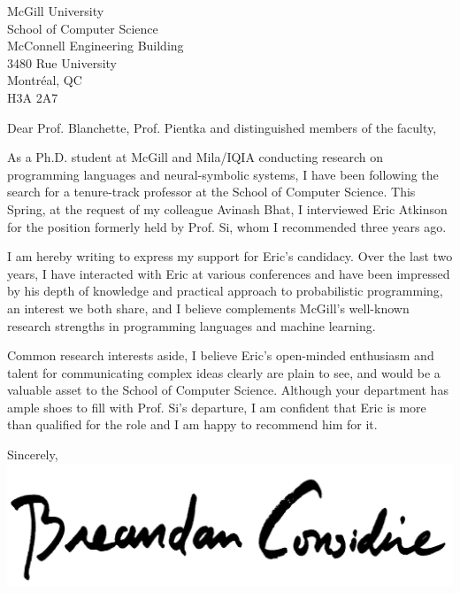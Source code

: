 \documentclass{letter}
\begin{document}
\begin{letter}{McGill University\\ School of Computer Science\\ McConnell Engineering Building\\ 3480 Rue University\\ Montr\'eal, QC\\ H3A 2A7}
  \opening{Dear Prof. Blanchette, Prof. Pientka and distinguished members of the faculty,}
  \vspace{12pt}

  As a Ph.D. student at McGill and Mila/IQIA conducting research on programming languages and neural-symbolic systems, I have been following the search for a tenure-track professor at the School of Computer Science. This Spring, at the request of my colleague Avinash Bhat, I interviewed Eric Atkinson for the position formerly held by Prof. Si, whom I recommended three years ago.

  I am hereby writing to express my support for Eric's candidacy. Over the last two years, I have interacted with Eric at various conferences and have been impressed by his depth of knowledge and practical approach to probabilistic programming, an interest we both share, and I believe complements McGill's well-known research strengths in programming languages and machine learning.

  Common research interests aside, I believe Eric's open-minded enthusiasm and talent for communicating complex ideas clearly are plain to see, and would be a valuable asset to the School of Computer Science. Although your department has ample shoes to fill with Prof. Si's departure, I am confident that Eric is more than qualified for the role and I am happy to recommend him for it.
  \vspace{10pt}

  \closing{Sincerely,\\
  \includegraphics[scale=0.06]{signature}\\
  }
\end{letter}
\end{document}
